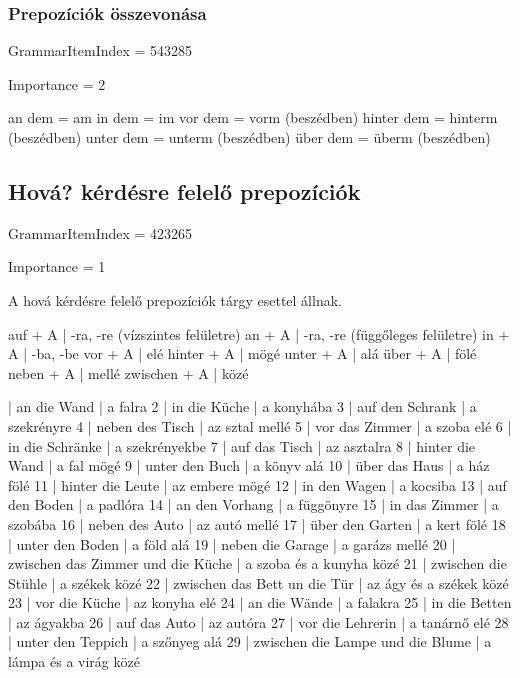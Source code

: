 \documentclass{article}
\newenvironment{desc}{\verbatim}{\endverbatim}
\newenvironment{exmp}{\verbatim}{\endverbatim}
\begin{document}
\subsubsection{Prepozíciók összevonása}

GrammarItemIndex = 543285

Importance = 2

\begin{desc}
an dem = am
in dem = im
vor dem = vorm (beszédben)
hinter dem = hinterm (beszédben)
unter dem = unterm (beszédben)
über dem = überm (beszédben)
\end{desc}

\subsection{Hová? kérdésre felelő prepozíciók}

GrammarItemIndex = 423265

Importance = 1

\begin{desc}
A hová kérdésre felelő prepozíciók tárgy esettel állnak.

auf + A      | -ra, -re (vízszintes felületre)
an + A       | -ra, -re (függőleges felületre)
in + A       | -ba, -be
vor + A      | elé
hinter + A   | mögé
unter + A    | alá
über + A     | fölé
neben + A    | mellé
zwischen + A | közé
\end{desc}

\begin{exmp}
1 | an die Wand | a falra
2 | in die Küche | a konyhába
3 | auf den Schrank | a szekrényre
4 | neben des Tisch | az sztal mellé
5 | vor das Zimmer | a szoba elé
6 | in die Schränke | a szekrényekbe
7 | auf das Tisch | az asztalra
8 | hinter die Wand | a fal mögé
9 | unter den Buch | a könyv alá
10 | über das Haus | a ház fölé
11 | hinter die Leute | az embere mögé
12 | in den Wagen | a kocsiba
13 | auf den Boden | a padlóra
14 | an den Vorhang | a függönyre
15 | in das Zimmer | a szobába
16 | neben des Auto | az autó mellé
17 | über den Garten | a kert fölé
18 | unter den Boden | a föld alá
19 | neben die Garage | a garázs mellé
20 | zwischen das Zimmer und die Küche | a szoba és a kunyha közé
21 | zwischen die Stühle | a székek közé
22 | zwischen das Bett un die Tür | az ágy és a székek közé
23 | vor die Küche | az konyha elé
24 | an die Wände | a falakra
25 | in die Betten | az ágyakba
26 | auf das Auto | az autóra
27 | vor die Lehrerin | a tanárnő elé
28 | unter den Teppich | a szőnyeg alá
29 | zwischen die Lampe und die Blume | a lámpa és a virág közé
\end{exmp}
\end{document}
